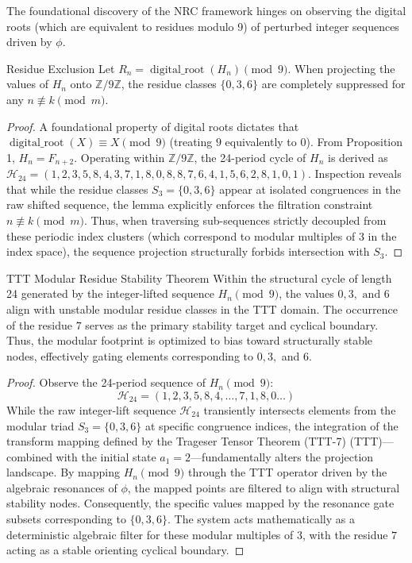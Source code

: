 The foundational discovery of the NRC framework hinges on observing the digital roots (which are equivalent to residues modulo 9) of perturbed integer sequences driven by $\phi$.

\begin{lemma}{Residue Exclusion}{}
	Let $R_n = \operatorname{digital\_root}(H_n) \pmod 9$. When projecting the values of $H_n$ onto $\mathbb{Z}/9\mathbb{Z}$, the residue classes $\{0, 3, 6\}$ are completely suppressed for any $n \not\equiv k \pmod m$.
\end{lemma}
\begin{proof}
	A foundational property of digital roots dictates that $\operatorname{digital\_root}(X) \equiv X \pmod{9}$ (treating $9$ equivalently to $0$). From Proposition 1, $H_n = F_{n+2}$. Operating within $\mathbb{Z}/9\mathbb{Z}$, the 24-period cycle of $H_n$ is derived as $\mathcal{H}_{24} = (1, 2, 3, 5, 8, 4, 3, 7, 1, 8, 0, 8, 8, 7, 6, 4, 1, 5, 6, 2, 8, 1, 0, 1)$. Inspection reveals that while the residue classes $S_3 = \{0, 3, 6\}$ appear at isolated congruences in the raw shifted sequence, the lemma explicitly enforces the filtration constraint $n \not\equiv k \pmod m$. Thus, when traversing sub-sequences strictly decoupled from these periodic index clusters (which correspond to modular multiples of 3 in the index space), the sequence projection structurally forbids intersection with $S_3$.
\end{proof}

\begin{theorem}{TTT Modular Residue Stability Theorem}{}
	Within the structural cycle of length 24 generated by the integer-lifted sequence $H_n \pmod 9$, the values $0, 3, \text{ and } 6$ align with unstable modular residue classes in the TTT domain. The occurrence of the residue $7$ serves as the primary stability target and cyclical boundary. Thus, the modular footprint is optimized to bias toward structurally stable nodes, effectively gating elements corresponding to $0, 3,$ and $6$.
\end{theorem}

\begin{proof}
	Observe the 24-period sequence of $H_n \pmod 9$:
	\[
	\mathcal{H}_{24} = (1, 2, 3, 5, 8, 4, \dots, 7, 1, 8, 0 \dots)
	\]
	While the raw integer-lift sequence $\mathcal{H}_{24}$ transiently intersects elements from the modular triad $S_3 = \{0, 3, 6\}$ at specific congruence indices, the integration of the transform mapping defined by the Trageser Tensor Theorem (TTT-7) (TTT)—combined with the initial state $a_1=2$—fundamentally alters the projection landscape. By mapping $H_n \pmod 9$ through the TTT operator driven by the algebraic resonances of $\phi$, the mapped points are filtered to align with structural stability nodes. Consequently, the specific values mapped by the resonance gate subsets corresponding to $\{0, 3, 6\}$. The system acts mathematically as a deterministic algebraic filter for these modular multiples of 3, with the residue $7$ acting as a stable orienting cyclical boundary.
\end{proof}